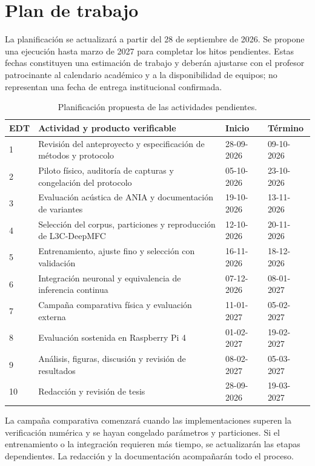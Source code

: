 \section{Plan de trabajo}
La planificación se actualizará a partir del 28 de septiembre de 2026. Se propone una ejecución hasta marzo de 2027 para completar los hitos pendientes. Estas fechas constituyen una estimación de trabajo y deberán ajustarse con el profesor patrocinante al calendario académico y a la disponibilidad de equipos; no representan una fecha de entrega institucional confirmada.

\begin{table}[H]
\centering\small
\renewcommand{\arraystretch}{1.18}
\begin{tabular}{|p{}|p{}|p{}|p{}|}
\hline
\textbf{EDT}&\textbf{Actividad y producto verificable}&\textbf{Inicio}&\textbf{Término}\\\hline
1&Revisión del anteproyecto y especificación de métodos y protocolo&28-09-2026&09-10-2026\\\hline
2&Piloto físico, auditoría de capturas y congelación del protocolo&05-10-2026&23-10-2026\\\hline
3&Evaluación acústica de ANIA y documentación de variantes&19-10-2026&13-11-2026\\\hline
4&Selección del corpus, particiones y reproducción de L3C-DeepMFC&12-10-2026&20-11-2026\\\hline
5&Entrenamiento, ajuste fino y selección con validación&16-11-2026&18-12-2026\\\hline
6&Integración neuronal y equivalencia de inferencia continua&07-12-2026&08-01-2027\\\hline
7&Campaña comparativa física y evaluación externa&11-01-2027&05-02-2027\\\hline
8&Evaluación sostenida en Raspberry Pi 4&01-02-2027&19-02-2027\\\hline
9&Análisis, figuras, discusión y revisión de resultados&08-02-2027&05-03-2027\\\hline
10&Redacción y revisión de tesis&28-09-2026&19-03-2027\\\hline
\end{tabular}
\caption{Planificación propuesta de las actividades pendientes.}
\label{tab:plan}
\end{table}

La campaña comparativa comenzará cuando las implementaciones superen la verificación numérica y se hayan congelado parámetros y particiones. Si el entrenamiento o la integración requieren más tiempo, se actualizarán las etapas dependientes. La redacción y la documentación acompañarán todo el proceso.


